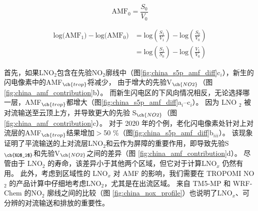 \begin{equation} \label{eq:AMF0}
\textrm{AMF}_0 = \frac{S_0}{V_0}
\end{equation}


\begin{equation} \label{eq:delta_AMF}
\begin{split}
\textrm{log(AMF$_1$)} - \textrm{log(AMF$_0$)} & = \textrm{log}(\frac{S_1}{V_1}) - \textrm{log}(\frac{S_0}{V_0}) \\
                                              & = \textrm{log}(\frac{S_1}{S_0}) - \textrm{log}(\frac{V_1}{V_0})
\end{split}
\end{equation}


首先，如果LNO$_2$包含在先验NO$_2$廓线中（图\ref{fig:china_s5p_amf_diff}c$_i$），新生的闪电像素中的AMF$_{\ch{trop}}$将减少，
由于增大的先验V$_{\ch{NO2}}$（图 \ref{fig:china_amf_contribution}b）。
而新生闪电区的下风向情况相反，无论选择哪一层，AMF$_{\ch{trop}}$都增大（图\ref{fig:china_s5p_amf_diff}a$_{i}$--c$_{i}$）。
因为 LNO $_2$ 被对流输送至云顶上方，并导致更大的先验 S$_{\ch{NO2}}$（图 \ref{fig:china_amf_contribution}c）。
对于 2020 年的个例，老化闪电像素处针对上对流层的AMF$_{\ch{trop}}$结果增加$>$50 \%（图\ref{fig:china_s5p_amf_diff}b$_{iii}$）。
该现象证明了平流输送的上对流层LNO$_2$和云作为屏障的重要作用，即导致先验S$_{\ch{NO$_2$}}$和先验V$_{\ch{NO2}}$之间的差异（图 \ref{fig:china_amf_contribution}d）。
尽管由于 LNO$_2$ 的寿命，该差异小于其他两个区域，但它对于计算LNO$_x$ 仍然有用。
此外，考虑到区域性的 LNO$_x$ 对 AMF 的影响，我们需要在 TROPOMI NO$_2$ 的产品计算中仔细地考虑LNO$_2$，尤其是在出流区域。
来自 TM5-MP 和 WRF-Chem 的NO$_2$ 廓线之间的比较（图 \ref{fig:china_nox_profile}）也说明了LNO$_x$、可分辨的对流输送和排放的重要性。



